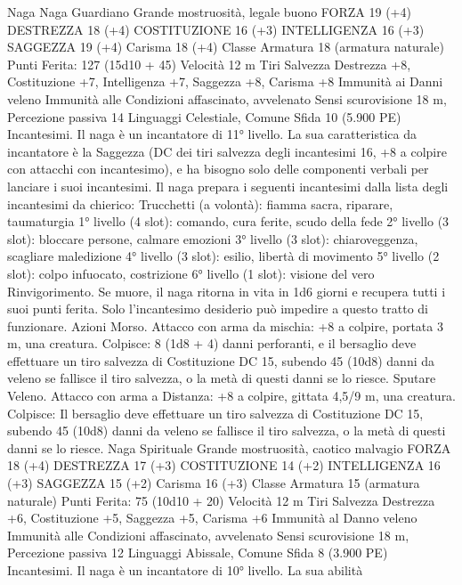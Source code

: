 \begin{multicols}{2}
Naga
Naga Guardiano
Grande mostruosità, legale buono
FORZA 19 (+4)
DESTREZZA 18 (+4)
COSTITUZIONE 16 (+3)
INTELLIGENZA 16 (+3)
SAGGEZZA 19 (+4)
Carisma 18 (+4)
Classe Armatura 18 (armatura naturale)
\hspace*{0pt}\hfill{Punti Ferita}: 127 (15d10 + 45)
Velocità 12 m
Tiri Salvezza Destrezza +8, Costituzione +7, Intelligenza +7,
Saggezza +8, Carisma +8
Immunità ai Danni veleno
Immunità alle Condizioni affascinato, avvelenato
Sensi scurovisione 18 m, Percezione passiva 14
Linguaggi Celestiale, Comune
Sfida 10 (5.900 PE)
Incantesimi. Il naga è un incantatore di 11° livello. La sua
caratteristica da incantatore è la Saggezza (DC dei tiri salvezza
degli incantesimi 16, +8 a colpire con attacchi con incantesimo),
e ha bisogno solo delle componenti verbali per lanciare i suoi
incantesimi. Il naga prepara i seguenti incantesimi dalla lista
degli incantesimi da chierico:
Trucchetti (a volontà): fiamma sacra, riparare, taumaturgia
1° livello (4 slot): comando, cura ferite, scudo della fede
2° livello (3 slot): bloccare persone, calmare emozioni
3° livello (3 slot): chiaroveggenza, scagliare maledizione
4° livello (3 slot): esilio, libertà di movimento
5° livello (2 slot): colpo infuocato, costrizione
6° livello (1 slot): visione del vero
Rinvigorimento. Se muore, il naga ritorna in vita in 1d6 giorni e
recupera tutti i suoi punti ferita. Solo l’incantesimo desiderio può
impedire a questo tratto di funzionare.
Azioni
Morso. Attacco con arma da mischia: +8 a colpire, portata 3 m,
una creatura.
Colpisce: 8 (1d8 + 4) danni perforanti, e il bersaglio deve
effettuare un tiro salvezza di Costituzione DC 15, subendo 45
(10d8) danni da veleno se fallisce il tiro salvezza, o la metà di
questi danni se lo riesce.
Sputare Veleno. Attacco con arma a Distanza: +8 a colpire,
gittata 4,5/9 m, una creatura.
Colpisce: Il bersaglio deve effettuare un tiro salvezza di
Costituzione DC 15, subendo 45 (10d8) danni da veleno se
fallisce il tiro salvezza, o la metà di questi danni se lo riesce.
Naga Spirituale
Grande mostruosità, caotico malvagio
FORZA 18 (+4)
DESTREZZA 17 (+3)
COSTITUZIONE 14 (+2)
INTELLIGENZA 16 (+3)
SAGGEZZA 15 (+2)
Carisma 16 (+3)
Classe Armatura 15 (armatura naturale)
\hspace*{0pt}\hfill{Punti Ferita}: 75 (10d10 + 20)
Velocità 12 m
Tiri Salvezza Destrezza +6, Costituzione +5, Saggezza +5,
Carisma +6
Immunità al Danno veleno
Immunità alle Condizioni affascinato, avvelenato
Sensi scurovisione 18 m, Percezione passiva 12
Linguaggi Abissale, Comune
Sfida 8 (3.900 PE)
Incantesimi. Il naga è un incantatore di 10° livello. La sua abilità

\end{multicols}
